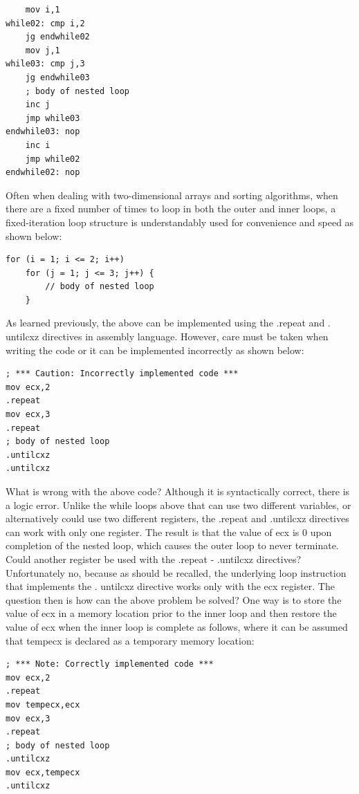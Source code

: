 \documentclass[10pt]{book}
\begin{document}
\begin{verbatim}
    mov i,1
while02: cmp i,2
    jg endwhile02
    mov j,1
while03: cmp j,3
    jg endwhile03
    ; body of nested loop
    inc j
    jmp while03
endwhile03: nop
    inc i
    jmp while02
endwhile02: nop
\end{verbatim}

Often when dealing with two-dimensional arrays and sorting algorithms, when there are a fixed number of times to loop in both the outer and inner loops, a fixed-iteration loop structure is understandably used for convenience and speed as shown below:
\begin{verbatim}
for (i = 1; i <= 2; i++)
    for (j = 1; j <= 3; j++) {
        // body of nested loop
    }
\end{verbatim}

As learned previously, the above can be implemented using the .repeat and . untilcxz directives in assembly language. However, care must be taken when writing the code or it can be implemented incorrectly as shown below:

\begin{verbatim}
; *** Caution: Incorrectly implemented code ***
mov ecx,2
.repeat
mov ecx,3
.repeat
; body of nested loop
.untilcxz
.untilcxz
\end{verbatim}

What is wrong with the above code? Although it is syntactically correct, there is a logic error. Unlike the while loops above that can use two different variables, or alternatively could use two different registers, the .repeat and .untilcxz directives can work with only one register. The result is that the value of ecx is 0 upon completion of the nested loop, which causes the outer loop to never terminate. Could another register be used with the .repeat - .untilcxz directives? Unfortunately no, because as should be recalled, the underlying loop instruction that implements the . untilcxz directive works only with the ecx register. The question then is how can the above problem be solved? One way is to store the\\
value of ecx in a memory location prior to the inner loop and then restore the value of ecx when the inner loop is complete as follows, where it can be assumed that tempecx is declared as a temporary memory location:
\begin{verbatim}
; *** Note: Correctly implemented code ***
mov ecx,2
.repeat
mov tempecx,ecx
mov ecx,3
.repeat
; body of nested loop
.untilcxz
mov ecx,tempecx
.untilcxz
\end{verbatim}
\end{document}
